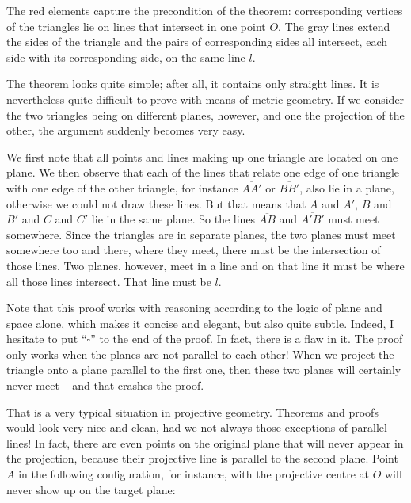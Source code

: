 \documentclass[tikz]{scrreprt}
\begin{document}
The red elements capture the precondition of the theorem:
corresponding vertices of the triangles 
lie on lines that intersect
in one point $O$.
The gray lines extend the sides of the triangle and
the pairs of corresponding sides all intersect, each side
with its corresponding side, on the same line $l$.

The theorem looks quite simple; after all, it contains
only straight lines. It is nevertheless quite difficult to prove
with means of metric geometry.
If we consider the two triangles being on different planes, however,
and one the projection of the other, the argument suddenly
becomes very easy.

We first note that all points and lines making up one triangle 
are located on one plane. We then observe 
that each of the lines that relate one edge of one triangle
with one edge of the other triangle,
for instance $\overline{AA\prime}$ or $\overline{BB\prime}$,
also lie in a plane, otherwise we could not draw these lines.
But that means that $A$ and $A\prime$, $B$ and $B\prime$ and
$C$ and $C\prime$ lie in the same plane. 
So the lines $\overline{AB}$ and $\overline{A\prime B\prime}$
must meet somewhere. 
Since the triangles are in separate planes, the two planes
must meet somewhere too and there, where they meet, there must
be the intersection of those lines. Two planes, however,
meet in a line and on that line it must be where all those
lines intersect. That line must be $l$.

Note that this proof works with reasoning according to the logic
of plane and space alone, which makes it concise and elegant,
but also quite subtle. Indeed, I hesitate to put ``$\square$'' to the
end of the proof. In fact, there is a flaw in it.
The proof only works when the planes 
are not parallel to each other!
When we project the triangle onto a plane parallel to the first one,
then these two planes will certainly never meet -- and that 
crashes the proof.

That is a very typical situation in projective geometry.
Theorems and proofs would look very nice and clean,
had we not always those exceptions of parallel lines!
In fact, there are even points on the original plane that will never appear
in the projection, because their projective line is
parallel to the second plane. Point $A$ in the following
configuration, for instance, with the projective centre at $O$
will never show up on the target plane: 
\end{document}
